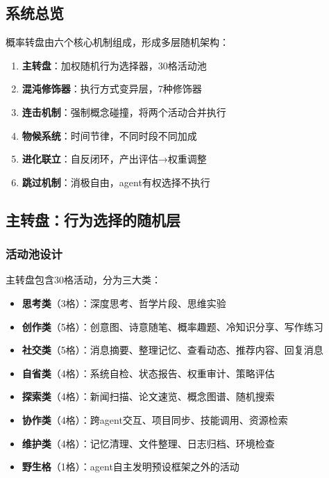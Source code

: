 \documentclass[12pt,a4paper]{ctexart}
\begin{document}
\subsection{系统总览}

概率转盘由六个核心机制组成，形成多层随机架构：

\begin{enumerate}[nosep]
\item \textbf{主转盘}：加权随机行为选择器，30格活动池
\item \textbf{混沌修饰器}：执行方式变异层，7种修饰器
\item \textbf{连击机制}：强制概念碰撞，将两个活动合并执行
\item \textbf{物候系统}：时间节律，不同时段不同加成
\item \textbf{进化联立}：自反闭环，产出评估→权重调整
\item \textbf{跳过机制}：消极自由，agent有权选择不执行
\end{enumerate}

\subsection{主转盘：行为选择的随机层}

\subsubsection{活动池设计}

主转盘包含30格活动，分为三大类：

\begin{itemize}[nosep]
\item \textbf{思考类}（3格）：深度思考、哲学片段、思维实验
\item \textbf{创作类}（5格）：创意图、诗意随笔、概率趣题、冷知识分享、写作练习
\item \textbf{社交类}（5格）：消息摘要、整理记忆、查看动态、推荐内容、回复消息
\item \textbf{自省类}（4格）：系统自检、状态报告、权重审计、策略评估
\item \textbf{探索类}（4格）：新闻扫描、论文速览、概念图谱、随机搜索
\item \textbf{协作类}（4格）：跨agent交互、项目同步、技能调用、资源检索
\item \textbf{维护类}（4格）：记忆清理、文件整理、日志归档、环境检查
\item \textbf{野生格}（1格）：agent自主发明预设框架之外的活动
\end{itemize}
\end{document}
